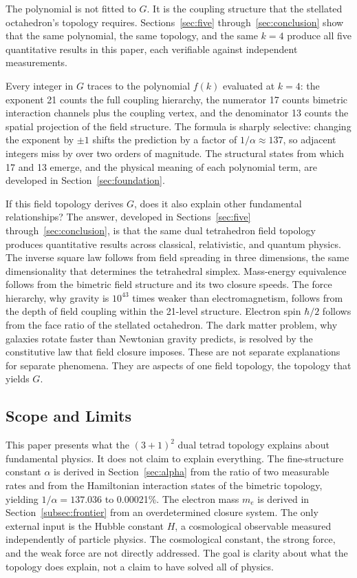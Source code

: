 \documentclass[aps,prd,preprint,superscriptaddress,showpacs,preprintnumbers,amsmath,amssymb,nofootinbib]{revtex4-2}
\begin{document}
The polynomial is not fitted to $G$. It is the coupling structure that the stellated octahedron's topology requires. Sections~\ref{sec:five} through~\ref{sec:conclusion} show that the same polynomial, the same topology, and the same $k = 4$ produce all five quantitative results in this paper, each verifiable against independent measurements.

Every integer in $G$ traces to the polynomial $f(k)$ evaluated at $k = 4$: the exponent 21 counts the full coupling hierarchy, the numerator 17 counts bimetric interaction channels plus the coupling vertex, and the denominator 13 counts the spatial projection of the field structure. The formula is sharply selective: changing the exponent by $\pm 1$ shifts the prediction by a factor of $1/\alpha \approx 137$, so adjacent integers miss by over two orders of magnitude. The structural states from which 17 and 13 emerge, and the physical meaning of each polynomial term, are developed in Section~\ref{sec:foundation}.

If this field topology derives $G$, does it also explain other fundamental relationships? The answer, developed in Sections~\ref{sec:five} through~\ref{sec:conclusion}, is that the same dual tetrahedron field topology produces quantitative results across classical, relativistic, and quantum physics. The inverse square law follows from field spreading in three dimensions, the same dimensionality that determines the tetrahedral simplex. Mass-energy equivalence follows from the bimetric field structure and its two closure speeds. The force hierarchy, why gravity is $10^{43}$ times weaker than electromagnetism, follows from the depth of field coupling within the 21-level structure. Electron spin $\hbar/2$ follows from the face ratio of the stellated octahedron. The dark matter problem, why galaxies rotate faster than Newtonian gravity predicts, is resolved by the constitutive law that field closure imposes. These are not separate explanations for separate phenomena. They are aspects of one field topology, the topology that yields $G$.

\subsection{Scope and Limits}
\label{subsec:limits}

This paper presents what the $(3+1)^2$ dual tetrad topology explains about fundamental physics. It does not claim to explain everything. The fine-structure constant $\alpha$ is derived in Section~\ref{sec:alpha} from the ratio of two measurable rates and from the Hamiltonian interaction states of the bimetric topology, yielding $1/\alpha = 137.036$ to 0.00021\%. The electron mass $m_e$ is derived in Section~\ref{subsec:frontier} from an overdetermined closure system. The only external input is the Hubble constant $H$, a cosmological observable measured independently of particle physics. The cosmological constant, the strong force, and the weak force are not directly addressed. The goal is clarity about what the topology does explain, not a claim to have solved all of physics.
\end{document}
